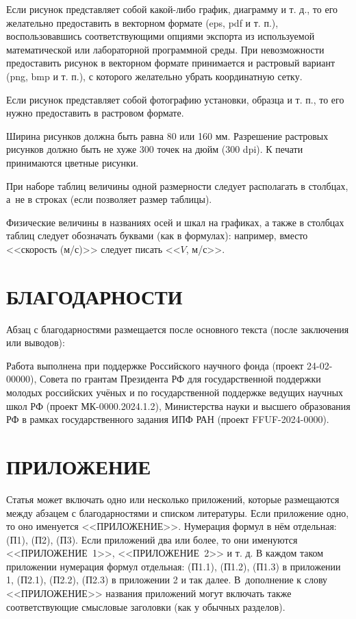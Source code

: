 \documentclass[12pt, a4paper]{article}
\begin{document}
Если рисунок представляет собой какой-либо график, диаграмму и т. д., то его желательно предоставить в векторном формате (eps, pdf и т. п.), воспользовавшись соответствующими опциями экспорта из используемой математической или лабораторной программной среды. При невозможности предоставить рисунок в векторном формате принимается и растровый вариант (png, bmp и т. п.), с которого желательно убрать координатную сетку.

Если рисунок представляет собой фотографию установки, образца и т. п., то его нужно предоставить в растровом формате.

Ширина рисунков должна быть равна 80 или 160 мм. Разрешение растровых рисунков должно быть не хуже 300 точек на дюйм (300 dpi). К печати принимаются цветные рисунки.

При наборе таблиц величины одной размерности следует располагать в столбцах, а~не в строках (если позволяет размер таблицы).

Физические величины в названиях осей и шкал на графиках, а также в столбцах таблиц следует обозначать буквами (как в формулах): например, вместо <<скорость (м/с)>> следует писать <<$V$, м/с>>.

\section{БЛАГОДАРНОСТИ}

Абзац с благодарностями размещается после основного текста (после заключения или выводов):

Работа выполнена при поддержке Российского научного фонда (проект 24-02-00000), Совета по грантам Президента РФ для государственной поддержки молодых российских учёных и по государственной поддержке ведущих научных школ РФ (проект МК-0000.2024.1.2), Министерства науки и высшего образования РФ в рамках государственного задания ИПФ РАН (проект FFUF-2024-0000).

\section*{\hfill ПРИЛОЖЕНИЕ}

Статья может включать одно или несколько приложений, которые размещаются между абзацем с благодарностями и списком литературы. Если приложение одно, то оно именуется <<ПРИЛОЖЕНИЕ>>. Нумерация формул в нём отдельная: (П1), (П2), (П3). Если приложений два или более, то они именуются <<ПРИЛОЖЕНИЕ~1>>, <<ПРИЛОЖЕНИЕ~2>> и т. д. В каждом таком приложении нумерация формул отдельная: (П1.1), (П1.2), (П1.3) в приложении 1, (П2.1), (П2.2), (П2.3) в приложении 2 и так далее. В~дополнение к слову <<ПРИЛОЖЕНИЕ>> названия приложений могут включать также соответствующие смысловые заголовки (как у обычных разделов).
\end{document}

